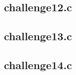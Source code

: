 \documentclass[12pt,titlepage]{article}
\begin{document}


\subsection{\textlatin{challenge12.c}}



\subsection{\textlatin{challenge13.c}}



\subsection{\textlatin{challenge14.c}}



\greektext
\end{document}
